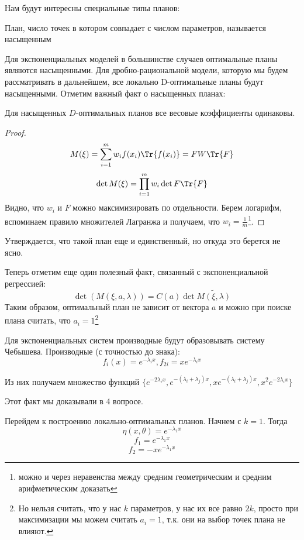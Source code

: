 Нам будут интересны специальные типы планов:
\begin{dfn}
План, число точек в котором совпадает с числом параметров, называется насыщенным
\end{dfn}

Для экспоненциальных моделей в большинстве случаев оптимальные планы являются насыщенными. Для дробно-рациональной модели, которую мы будем рассматривать в дальнейшем, все локально D-оптимальные планы будут насыщенными. Отметим важный факт о насыщенных планах:
\begin{thm}
Для насыщенных $D$-оптимальных планов все весовые коэффициенты одинаковы.
\end{thm}

\begin{proof}
$$ M(\xi) = \sum\limits_{i=1}^{m} w_i f(x_i)\Tr{f(x_i)} = FW\Tr{F}$$
$$ \det M(\xi) = \prod\limits_{i=1}^{m}w_i \det F\Tr{F} $$
Видно, что $w_i$ и $F$ можно максимизировать по отдельности. Берем логарифм, вспоминаем правило множителей Лагранжа и получаем, что $w_i = \frac{1}{m}$\footnote{можно и через неравенства между средним геометрическим и средним арифметическим доказать}.
\end{proof}
\begin{note}
Утверждается, что такой план еще и единственный, но откуда это берется не ясно.
\end{note}

Теперь отметим еще один полезный факт, связанный с экспоненциальной регрессией:
$$ \det(M(\xi, a, \lambda)) = C(a) \det\tilde{M(\xi, \lambda)}$$
Таким образом, оптимальный план не зависит от вектора $a$ и можно при поиске плана считать, что $a_i = 1$\footnote{Но нельзя считать, что у нас $k$ параметров, у нас их все равно $2k$, просто при максимизации мы можем считать $a_i=1$, т.к. они на выбор точек плана не влияют.}


Для экспоненциальных систем производные будут образовывать систему Чебышева. 
Производные (с точностью до знака):
$$f_i(x) = e^{-\lambda_ix}, f_{2i} = x e^{-\lambda_i x}$$

Из них получаем множество функций $\{e^{-2\lambda_i x}, e^{-(\lambda_i + \lambda_j) x}, xe^{-(\lambda_i + \lambda_j) x}, x^2e^{-2\lambda_i x} \}$

Этот факт мы доказывали в 4 вопросе.

Перейдем к построению локально-оптимальных планов. Начнем с $k=1$. Тогда
$$\eta(x, \theta) = e^{-\lambda_1x}$$
$$f_1 = e^{-\lambda_1x}$$
$$f_2 = -xe^{-\lambda_1x}$$

